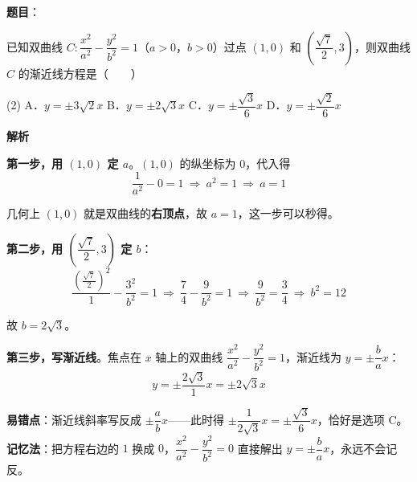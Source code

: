 \begin{answer}

\textbf{题目}：

已知双曲线 $C:\dfrac{x^2}{a^2}-\dfrac{y^2}{b^2}=1$（$a>0$，$b>0$）过点 $(1,0)$ 和 $\left(\dfrac{\sqrt{7}}{2},3\right)$，则双曲线 $C$ 的渐近线方程是\mbox{（　　）}

\begin{gkopts}(2)
\task A．$y=\pm3\sqrt{2}x$
\task B．$y=\pm2\sqrt{3}x$
\task C．$y=\pm\dfrac{\sqrt{3}}{6}x$
\task D．$y=\pm\dfrac{\sqrt{2}}{6}x$
\end{gkopts}

\textbf{解析}

\textbf{第一步，用 $(1,0)$ 定 $a$}。$(1,0)$ 的纵坐标为 $0$，代入得
\nopagebreak[4]
\[\frac{1}{a^2}-0=1\ \Longrightarrow\ a^2=1\ \Longrightarrow\ a=1\]

\begin{gktip}
几何上 $(1,0)$ 就是双曲线的\textbf{右顶点}，故 $a=1$，这一步可以秒得。
\end{gktip}

\textbf{第二步，用 $\left(\dfrac{\sqrt7}{2},3\right)$ 定 $b$}：
\nopagebreak[4]
\[\frac{\left(\frac{\sqrt7}{2}\right)^2}{1}-\frac{3^2}{b^2}=1\ \Longrightarrow\ \frac74-\frac{9}{b^2}=1\ \Longrightarrow\ \frac{9}{b^2}=\frac34\ \Longrightarrow\ b^2=12\]

故 $b=2\sqrt3$。

\textbf{第三步，写渐近线}。焦点在 $x$ 轴上的双曲线 $\dfrac{x^2}{a^2}-\dfrac{y^2}{b^2}=1$，渐近线为 $y=\pm\dfrac{b}{a}x$：
\nopagebreak[4]
\[y=\pm\frac{2\sqrt3}{1}x=\pm2\sqrt3x\]

\begin{gktip}
\textbf{易错点}：渐近线斜率写反成 $\pm\dfrac{a}{b}x$——此时得 $\pm\dfrac{1}{2\sqrt3}x=\pm\dfrac{\sqrt3}{6}x$，恰好是选项 C。\textbf{记忆法}：把方程右边的 $1$ 换成 $0$，$\dfrac{x^2}{a^2}-\dfrac{y^2}{b^2}=0$ 直接解出 $y=\pm\dfrac{b}{a}x$，永远不会记反。
\end{gktip}


\par\medskip

\end{answer}
